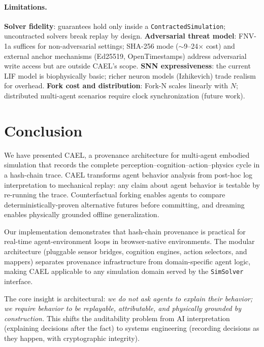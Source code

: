 \documentclass[sigconf,nonacm]{acmart}
\begin{document}
\paragraph{Limitations.}
\textbf{Solver fidelity}: guarantees hold only inside a \texttt{ContractedSimulation};
uncontracted solvers break replay by design.
\textbf{Adversarial threat model}: FNV-1a suffices for non-adversarial settings;
SHA-256 mode ($\sim$9--24$\times$ cost) and external anchor mechanisms (Ed25519,
OpenTimestamps) address adversarial write access but are outside CAEL's scope.
\textbf{SNN expressiveness}: the current LIF model is biophysically basic; richer
neuron models (Izhikevich) trade realism for overhead.
\textbf{Fork cost and distribution}: Fork-N scales linearly with $N$; distributed
multi-agent scenarios require clock synchronization (future work).

\section{Conclusion}
\label{sec:conclusion}

We have presented CAEL, a provenance architecture for multi-agent
embodied simulation that records the complete
perception--cognition--action--physics cycle in a hash-chain trace.
CAEL transforms agent behavior analysis from post-hoc log
interpretation to mechanical replay: any claim about agent behavior
is testable by re-running the trace. Counterfactual forking enables
agents to compare deterministically-proven alternative futures before
committing, and dreaming enables physically grounded offline
generalization.

Our implementation demonstrates that hash-chain provenance is practical
for real-time agent-environment loops in browser-native environments.
The modular architecture (pluggable sensor bridges, cognition engines,
action selectors, and mappers) separates provenance infrastructure
from domain-specific agent logic, making CAEL applicable to any
simulation domain served by the \texttt{SimSolver} interface.

The core insight is architectural: \emph{we do not ask agents to explain
their behavior; we require behavior to be replayable, attributable, and
physically grounded by construction.} This shifts the auditability problem
from AI interpretation (explaining decisions after the fact) to systems
engineering (recording decisions as they happen, with cryptographic
integrity).
\end{document}
